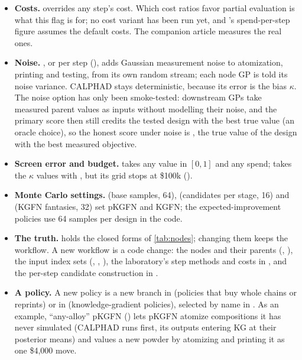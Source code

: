 \documentclass[11pt]{article}
\begin{document}
\begin{itemize}[leftmargin=*]
\item \textbf{Costs.}  overrides any step's cost.
Which cost ratios favor partial evaluation is what this flag is for; no cost
variant has been run yet, and 's spend-per-step figure
assumes the default costs. The companion article measures the real ones.
\item \textbf{Noise.} , or per step (), adds Gaussian measurement noise to atomization, printing and
testing, from its own random stream; each node GP is told its noise variance.
CALPHAD stays deterministic, because its error is the bias $\kappa$. The noise
option has only been smoke-tested: downstream GPs take measured parent values as
inputs without modelling their noise, and the primary score then still credits
the tested design with the best true value (an oracle choice), so the honest
score under noise is , the true value of the design with
the best measured objective.
\item \textbf{Screen error and budget.}  takes any value in
$[0,1]$ and  any spend;  takes the
$\kappa$ values with , but its grid stops at \$100k
().
\item \textbf{Monte Carlo settings.}  (base samples, 64),
 (candidates per stage, 16) and  (KGFN
fantasies, 32) set pKGFN and KGFN; the expected-improvement policies use 64
samples per design in the code.
\item \textbf{The truth.}  holds the closed forms of
\cref{tab:nodes}; changing them keeps the workflow. A new workflow is a code
change: the nodes and their parents (, ), the input
index sets (, , ), the laboratory's step methods
and costs in , and the per-step candidate construction in
.
\item \textbf{A policy.} A new policy is a new branch in 
(policies that buy whole chains or reprints) or in 
(knowledge-gradient policies), selected by name in . As an example, ``any-alloy'' pKGFN
() lets pKGFN atomize compositions it has never simulated
(CALPHAD runs first, its outputs entering KG at their posterior means) and
values a new powder by atomizing and printing it as one \$4,000 move.

\end{itemize}
\end{document}

